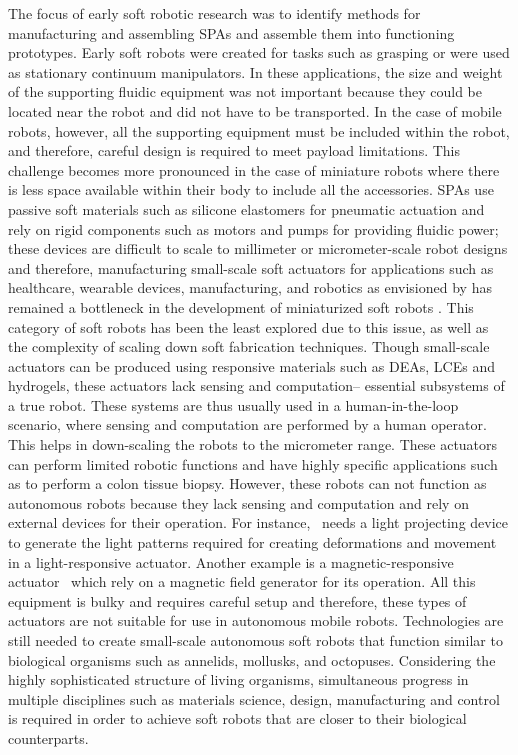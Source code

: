 The focus of early soft robotic research was to identify methods for manufacturing and assembling SPAs and assemble them into functioning prototypes. Early soft robots were created for tasks such as grasping or were used as stationary continuum manipulators. In these applications, the size and weight of the supporting fluidic equipment was not important because they could be located near the robot and did not have to be transported. In the case of mobile robots, however, all the supporting equipment must be included within the robot, and therefore, careful design is required to meet payload limitations. This challenge becomes more pronounced in the case of miniature robots where there is less space available within their body to include all the accessories. SPAs use passive soft materials such as silicone elastomers for pneumatic actuation and rely on rigid components such as motors and pumps for providing fluidic power; these devices are difficult to scale to millimeter or micrometer-scale robot designs and therefore, manufacturing small-scale soft actuators for applications such as healthcare, wearable devices, manufacturing, and robotics as envisioned by \cite{Hines2017} has remained a bottleneck in the development of miniaturized soft robots \cite{Majidi2019}. This category of soft robots has been the least explored due to this issue, as well as the complexity of scaling down soft fabrication techniques. Though small-scale actuators can be produced using responsive materials such as DEAs, LCEs and hydrogels, these actuators lack sensing and computation-- essential subsystems of a true robot. These systems are thus usually used in a human-in-the-loop scenario, where sensing and computation are performed by a human operator. This helps in down-scaling the robots to the micrometer range. These actuators can perform limited robotic functions and have highly specific applications such as to perform a colon tissue biopsy. However, these robots can not function as autonomous robots because they lack sensing and computation and rely on external devices for their operation. For instance,~\cite{Palagi2016} needs a light projecting device to generate the light patterns required for creating deformations and movement in a light-responsive actuator. Another example is a magnetic-responsive actuator~\cite{Kim2018} which rely on a magnetic field generator for its operation. All this equipment is bulky and requires careful setup and therefore, these types of actuators are not suitable for use in autonomous mobile robots. Technologies are still needed to create small-scale autonomous soft robots that function similar to biological organisms such as annelids, mollusks, and octopuses. Considering the highly sophisticated structure of living organisms, simultaneous progress in multiple disciplines such as materials science, design, manufacturing and control is required in order to achieve soft robots that are closer to their biological counterparts.


